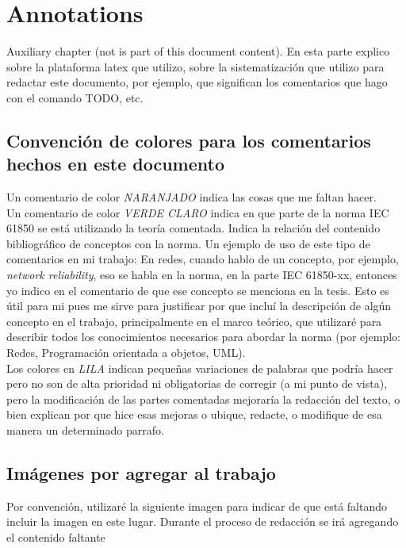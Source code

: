 \chapter*{Annotations}

Auxiliary chapter (not is part of this document content).
En esta parte explico sobre la plataforma latex que utilizo, sobre la
sistematizaci\'on que utilizo para redactar este documento, por ejemplo, que
significan los comentarios que hago con el comando TODO, etc.

\section{Convenci\'on de colores para los comentarios hechos en este documento}
	Un comentario de color 
	\emph{NARANJADO}
	indica las cosas que me faltan hacer.\\

	Un comentario de color 
	\emph{VERDE CLARO}
	indica en que parte de la norma IEC 61850 se est\'a utilizando la teor\'ia
	comentada. Indica la relaci\'on del contenido bibliogr\'afico de conceptos con
	la norma. 
	Un ejemplo de uso de este tipo de comentarios en mi trabajo:
	En redes, cuando hablo de un concepto, por ejemplo, \emph{network
	reliability}, eso se habla en la norma, en la parte IEC 61850-xx, entonces yo
	indico en el comentario de que ese concepto se menciona en la tesis. 
	Esto es \'util para mi pues me sirve para justificar por que inclu\'i la 
	descripci\'on de alg\'un concepto en el trabajo, principalmente en el marco
	te\'orico, que utilizar\'e para describir todos los conocimientos necesarios
	para abordar la norma (por ejemplo: Redes, Programaci\'on orientada a
	objetos, UML).\\
	
	Los colores en \emph{LILA}
	indican peque\~nas variaciones de palabras que podr\'ia hacer pero no son de
	alta prioridad ni obligatorias de corregir (a mi punto de vista), pero
	la modificaci\'on de las partes comentadas mejorar\'ia la redacci\'on del
	texto, o bien explican por que hice esas mejoras o ubique, redacte, 
	o modifique de esa 	manera un determinado parrafo.
	

\section{Im\'agenes por agregar al trabajo}
	Por convenci\'on, utilizar\'e la siguiente imagen
	para indicar de que est\'a faltando incluir la imagen en este lugar. Durante
	el proceso de redacci\'on se ir\'a agregando el contenido faltante


